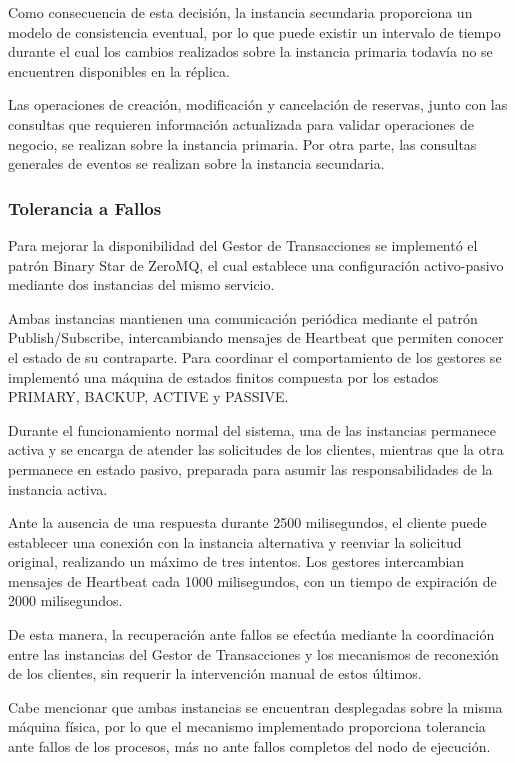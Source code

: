 \documentclass[conference]{IEEEtran}
\begin{document}
Como consecuencia de esta decisión, la instancia secundaria proporciona 
un modelo de consistencia eventual, por lo que puede existir un intervalo 
de tiempo durante el cual los cambios realizados sobre la instancia 
primaria todavía no se encuentren disponibles en la réplica.

Las operaciones de creación, modificación y cancelación de reservas, 
junto con las consultas que requieren información actualizada para 
validar operaciones de negocio, se realizan sobre la instancia primaria. 
Por otra parte, las consultas generales de eventos se realizan sobre 
la instancia secundaria.


\subsubsection{Tolerancia a Fallos}

Para mejorar la disponibilidad del Gestor de Transacciones se implementó
el patrón Binary Star de ZeroMQ, el cual establece una configuración
activo-pasivo mediante dos instancias del mismo servicio.

Ambas instancias mantienen una comunicación periódica mediante el
patrón Publish/Subscribe, intercambiando mensajes de Heartbeat que
permiten conocer el estado de su contraparte. Para coordinar el
comportamiento de los gestores se implementó una máquina de estados
finitos compuesta por los estados PRIMARY, BACKUP, ACTIVE y PASSIVE.

Durante el funcionamiento normal del sistema, una de las instancias
permanece activa y se encarga de atender las solicitudes de los clientes,
mientras que la otra permanece en estado pasivo, preparada para asumir
las responsabilidades de la instancia activa.

Ante la ausencia de una respuesta durante
2500 milisegundos, el cliente puede establecer una conexión
con la instancia alternativa y reenviar la solicitud original,
realizando un máximo de tres intentos. Los gestores intercambian
mensajes de Heartbeat cada 1000 milisegundos, con un tiempo de
expiración de 2000 milisegundos.

De esta manera, la recuperación ante fallos se efectúa mediante la
coordinación entre las instancias del Gestor de Transacciones y los
mecanismos de reconexión de los clientes, sin requerir la intervención
manual de estos últimos.

Cabe mencionar que ambas instancias se encuentran desplegadas sobre
la misma máquina física, por lo que el mecanismo implementado proporciona
tolerancia ante fallos de los procesos, más no ante fallos completos
del nodo de ejecución.
\end{document}
